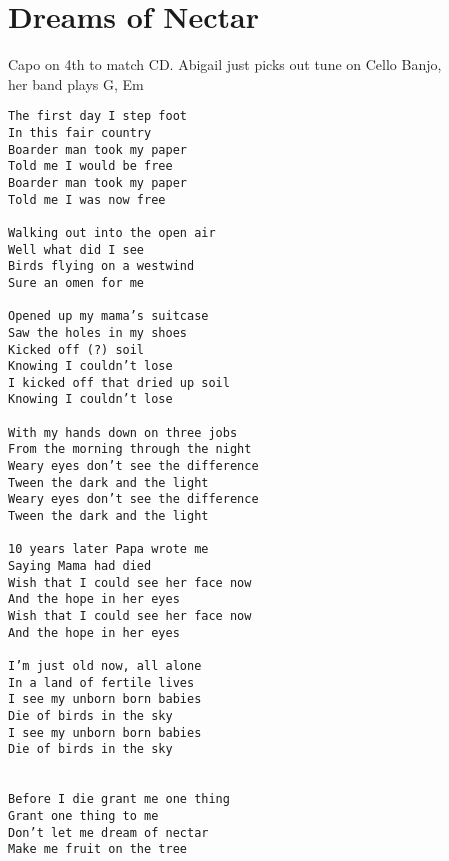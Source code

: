 \documentclass[leqno]{memoir}
\begin{document}
\chapter{Dreams of Nectar}
Capo on 4th to match CD.
Abigail just picks out tune on Cello Banjo, \\
her band plays G, Em
\begin{verbatim}
The first day I step foot
In this fair country
Boarder man took my paper
Told me I would be free
Boarder man took my paper
Told me I was now free

Walking out into the open air
Well what did I see
Birds flying on a westwind
Sure an omen for me

Opened up my mama’s suitcase
Saw the holes in my shoes
Kicked off (?) soil
Knowing I couldn’t lose
I kicked off that dried up soil
Knowing I couldn’t lose

With my hands down on three jobs
From the morning through the night
Weary eyes don’t see the difference
Tween the dark and the light
Weary eyes don’t see the difference
Tween the dark and the light

10 years later Papa wrote me
Saying Mama had died
Wish that I could see her face now
And the hope in her eyes
Wish that I could see her face now
And the hope in her eyes

I’m just old now, all alone
In a land of fertile lives
I see my unborn born babies
Die of birds in the sky
I see my unborn born babies
Die of birds in the sky


Before I die grant me one thing
Grant one thing to me
Don’t let me dream of nectar
Make me fruit on the tree
\end{verbatim}
\newpage
\end{document}
